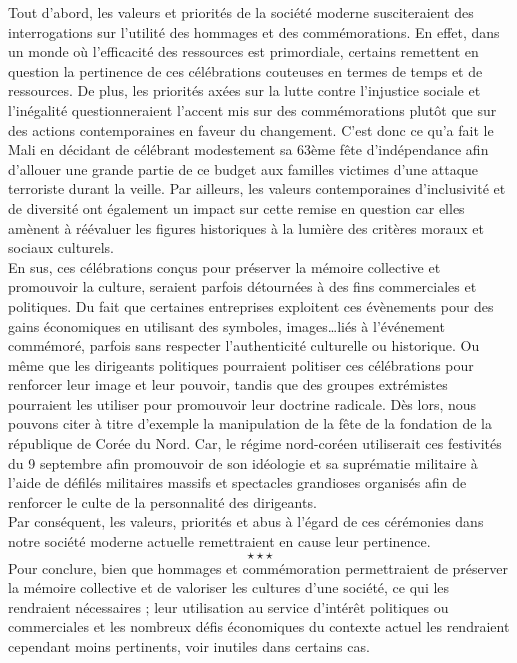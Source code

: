 \hspace*{0.5cm}Tout d’abord, les valeurs et priorités de la société moderne susciteraient des interrogations sur l’utilité des hommages et des commémorations. En effet, dans un monde où l’efficacité des ressources est primordiale, certains remettent en question la pertinence de ces célébrations couteuses en termes de temps et de ressources. De plus, les priorités axées sur la lutte contre l’injustice sociale et l’inégalité questionneraient l’accent mis sur des commémorations plutôt que sur des actions contemporaines en faveur du changement. C’est donc ce qu’a fait le Mali en décidant de célébrant modestement sa 63ème fête d’indépendance afin d’allouer une grande partie de ce budget aux familles victimes d’une attaque terroriste durant la veille. Par ailleurs, les valeurs contemporaines d’inclusivité et de diversité ont également un impact sur cette remise en question car elles amènent à réévaluer les figures historiques à la lumière des critères moraux et sociaux culturels.\\
\hspace*{0.5cm}En sus, ces célébrations conçus pour préserver la mémoire collective et promouvoir la culture, seraient parfois détournées à des fins commerciales et politiques. Du fait que certaines entreprises exploitent ces évènements pour des gains économiques en utilisant des symboles, images…liés à l’événement commémoré, parfois sans respecter l’authenticité culturelle ou historique. Ou même que les dirigeants politiques pourraient politiser ces célébrations pour renforcer leur image et leur pouvoir, tandis que des groupes extrémistes pourraient les utiliser pour promouvoir leur doctrine radicale. Dès lors, nous pouvons citer à titre d’exemple la manipulation de la fête de la fondation de la république de Corée du Nord. Car, le régime nord-coréen utiliserait ces festivités du 9 septembre afin promouvoir de son idéologie et sa suprématie militaire à l’aide de défilés militaires massifs et spectacles grandioses organisés afin de renforcer le culte de la personnalité des dirigeants. \\
\hspace*{0.5cm}Par conséquent, les valeurs, priorités et abus à l’égard de ces cérémonies dans notre société moderne actuelle remettraient en cause leur pertinence. 
$$\star \star \star$$
\hspace*{0.5cm}Pour conclure, bien que hommages et commémoration permettraient de préserver la mémoire collective et de valoriser les cultures d’une société, ce qui les rendraient nécessaires ; leur utilisation au service d’intérêt politiques ou commerciales et les nombreux défis économiques du contexte actuel les rendraient cependant moins pertinents, voir inutiles dans certains cas. \newpage